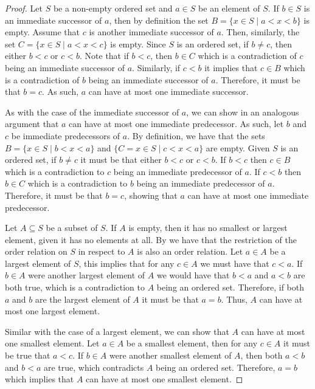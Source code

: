\documentclass[12pt]{article}
\begin{document}
\begin{proof}
	Let $S$ be a non-empty ordered set and $a \in S$ be an element of $S$. If $b \in S$ is an immediate
	successor of $a$, then by definition the set $B = \{x \in S \mid a < x < b\}$ is empty. Assume that
	$c$ is another immediate successor of $a$. Then, similarly, the set $C = \{x \in S \mid a < x < c\}$
	is empty. Since $S$ is an ordered set, if $b \neq c$, then either $b < c$ or $c < b$. Note that 
	if $b < c$, then $b \in C$ which is a contradiction of $c$ being an immediate successor of $a$.
	Similarly, if $c < b$ it implies that $c \in B$ which is a contradiction of $b$ being an immediate
	successor of $a$. Therefore, it must be that $b = c$. As such, $a$ can have at most one
	immediate successor. 
	
	As with the case of the immediate successor of $a$, we can show in an analogous argument that 
	$a$ can have at most one immediate predecessor. As such, let $b$ and $c$ be immediate predecessors
	of $a$. By definition, we have that the sets $B = \{x \in S \mid b < x < a\}$ and 
	$\{C = x \in S \mid c < x < a\}$ are empty. Given $S$ is an ordered set, if $b \neq c$ it must
	be that either $b < c$ or $c < b$. If $b < c$ then $c \in B$ which is a contradiction to $c$
	being an immediate predecessor of $a$. If $c < b$ then $b \in C$ which is a contradiction to
	$b$ being an immediate predecessor of $a$. Therefore, it must be that $b = c$, showing that 
	$a$ can have at most one immediate predecessor. 
	
	Let $A \subseteq S$ be a subset of $S$. If $A$ is empty, then it has no smallest or 
	largest element, given it has no elements at all. By  we have that 
	the restriction of the order relation on $S$ in respect to $A$ is also an order relation.
	Let $a \in A$ be a largest element of $S$, this implies that for any $c \in A$ we must 
	have that $c < a$. If $b \in A$ were another largest element of $A$ we would have that 
	$b < a$ and $a < b$ are both true, which is a contradiction to $A$ being an ordered set.
	Therefore, if both $a$ and $b$ are the largest element of $A$ it must be that $a = b$.
	Thus, $A$ can have at most one largest element.
	
	Similar with the case of a largest element, we can show that $A$ can have at most one smallest 
	element. Let $a \in A$ be a smallest element, then for any $c \in A$ it must be true 
	that $a < c$. If $b \in A$ were another smallest element of $A$, then both $a < b$ and 
	$b < a$ are true, which contradicts $A$ being an ordered set. Therefore, $a = b$ which implies
	that $A$ can have at most one smallest element. 
\end{proof}
\end{document}
